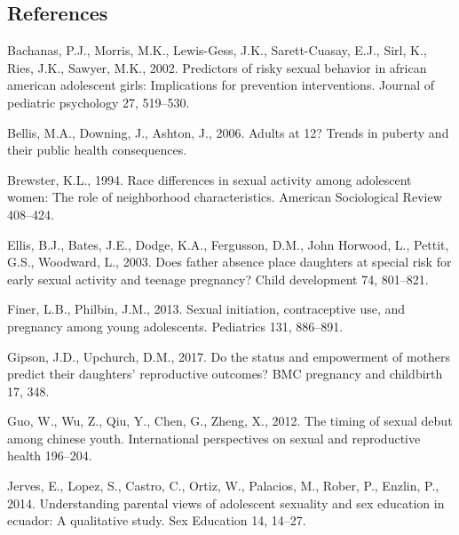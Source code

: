 \documentclass[
]{article}
\newlength{\cslhangindent}
\newenvironment{cslreferences}%
  {\setlength{\parindent}{0pt}%
  \everypar{\setlength{\hangindent}{\cslhangindent}}\ignorespaces}%
  {\par}
\begin{document}
\hypertarget{references}{%
\subsection*{References}\label{references}}

\hypertarget{refs}{}
\begin{cslreferences}
\leavevmode\hypertarget{ref-bachanas2002predictors}{}%
Bachanas, P.J., Morris, M.K., Lewis-Gess, J.K., Sarett-Cuasay, E.J.,
Sirl, K., Ries, J.K., Sawyer, M.K., 2002. Predictors of risky sexual
behavior in african american adolescent girls: Implications for
prevention interventions. Journal of pediatric psychology 27, 519--530.

\leavevmode\hypertarget{ref-bellis2006adults}{}%
Bellis, M.A., Downing, J., Ashton, J., 2006. Adults at 12? Trends in
puberty and their public health consequences.

\leavevmode\hypertarget{ref-brewster1994race}{}%
Brewster, K.L., 1994. Race differences in sexual activity among
adolescent women: The role of neighborhood characteristics. American
Sociological Review 408--424.

\leavevmode\hypertarget{ref-ellis2003does}{}%
Ellis, B.J., Bates, J.E., Dodge, K.A., Fergusson, D.M., John Horwood,
L., Pettit, G.S., Woodward, L., 2003. Does father absence place
daughters at special risk for early sexual activity and teenage
pregnancy? Child development 74, 801--821.

\leavevmode\hypertarget{ref-finer2013sexual}{}%
Finer, L.B., Philbin, J.M., 2013. Sexual initiation, contraceptive use,
and pregnancy among young adolescents. Pediatrics 131, 886--891.

\leavevmode\hypertarget{ref-gipson2017status}{}%
Gipson, J.D., Upchurch, D.M., 2017. Do the status and empowerment of
mothers predict their daughters' reproductive outcomes? BMC pregnancy
and childbirth 17, 348.

\leavevmode\hypertarget{ref-guo2012timing}{}%
Guo, W., Wu, Z., Qiu, Y., Chen, G., Zheng, X., 2012. The timing of
sexual debut among chinese youth. International perspectives on sexual
and reproductive health 196--204.

\leavevmode\hypertarget{ref-jerves2014understanding}{}%
Jerves, E., Lopez, S., Castro, C., Ortiz, W., Palacios, M., Rober, P.,
Enzlin, P., 2014. Understanding parental views of adolescent sexuality
and sex education in ecuador: A qualitative study. Sex Education 14,
14--27.


\end{cslreferences}
\end{document}

